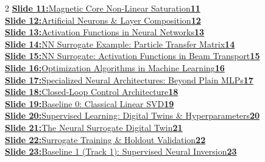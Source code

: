 \documentclass[11pt,a4paper]{article}
\begin{document}
{\begin{multicols}{2}
\noindent\hyperlink{slide.11}{\textbf{\color{primaryblue}Slide 11:}\enspace Magnetic Core Non-Linear Saturation\enspace\dotfill\enspace\textbf{11}} \\[0.22em]
\noindent\hyperlink{slide.12}{\textbf{\color{primaryblue}Slide 12:}\enspace Artificial Neurons \& Layer Composition\enspace\dotfill\enspace\textbf{12}} \\[0.22em]
\noindent\hyperlink{slide.13}{\textbf{\color{primaryblue}Slide 13:}\enspace Activation Functions in Neural Networks\enspace\dotfill\enspace\textbf{13}} \\[0.22em]
\noindent\hyperlink{slide.14}{\textbf{\color{primaryblue}Slide 14:}\enspace NN Surrogate Example: Particle Transfer Matrix\enspace\dotfill\enspace\textbf{14}} \\[0.22em]
\noindent\hyperlink{slide.15}{\textbf{\color{primaryblue}Slide 15:}\enspace NN Surrogate: Activation Functions in Beam Transport\enspace\dotfill\enspace\textbf{15}} \\[0.22em]
\noindent\hyperlink{slide.16}{\textbf{\color{primaryblue}Slide 16:}\enspace Optimization Algorithms in Machine Learning\enspace\dotfill\enspace\textbf{16}} \\[0.22em]
\noindent\hyperlink{slide.17}{\textbf{\color{primaryblue}Slide 17:}\enspace Specialized Neural Architectures: Beyond Plain MLPs\enspace\dotfill\enspace\textbf{17}} \\[0.22em]
\noindent\hyperlink{slide.18}{\textbf{\color{primaryblue}Slide 18:}\enspace Closed-Loop Control Architecture\enspace\dotfill\enspace\textbf{18}} \\[0.22em]
\noindent\hyperlink{slide.19}{\textbf{\color{primaryblue}Slide 19:}\enspace Baseline 0: Classical Linear SVD\enspace\dotfill\enspace\textbf{19}} \\[0.22em]
\noindent\hyperlink{slide.20}{\textbf{\color{primaryblue}Slide 20:}\enspace Supervised Learning: Digital Twins \& Hyperparameters\enspace\dotfill\enspace\textbf{20}} \\[0.22em]
\noindent\hyperlink{slide.21}{\textbf{\color{primaryblue}Slide 21:}\enspace The Neural Surrogate Digital Twin\enspace\dotfill\enspace\textbf{21}} \\[0.22em]
\noindent\hyperlink{slide.22}{\textbf{\color{primaryblue}Slide 22:}\enspace Surrogate Training \& Holdout Validation\enspace\dotfill\enspace\textbf{22}} \\[0.22em]
\noindent\hyperlink{slide.23}{\textbf{\color{primaryblue}Slide 23:}\enspace Baseline 1 (Track 1): Supervised Neural Inversion\enspace\dotfill\enspace\textbf{23}} \\[0.22em]

\end{multicols}}
\end{document}
